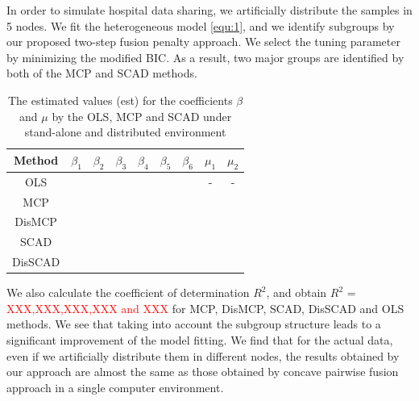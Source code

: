 \documentclass[review]{elsarticle}
\begin{document}
In order to simulate hospital data sharing, we artificially distribute the samples in 5 nodes. We fit the heterogeneous model \ref{equ:1}, and we identify subgroups by our proposed two-step fusion penalty approach. We select the tuning parameter by minimizing the modified BIC. As a result, two major groups are identified by both of the MCP and SCAD methods.
\begin{table}[H]
	\centering
	\fontsize{5.5}{6}\selectfont
	\begin{threeparttable}
		\caption{The estimated values (est) for the coefficients $\beta$ and $\mu$ by the OLS, MCP and SCAD under stand-alone and distributed environment}
		\label{tab:3}
		\begin{tabular}{ccccccccc}
			\toprule
			Method&$\beta_1$&$\beta_2$&$\beta_3$&$\beta_4$&$\beta_5$&$\beta_6$&$\mu_1$&$\mu_2$\\
			\midrule
			OLS&&&&&&&-&-\\
			MCP&&&&&&&&\\
			DisMCP&&&&&&&&\\
			SCAD&&&&&&&&\\
			DisSCAD&&&&&&&&\\
			\bottomrule
		\end{tabular}
	\end{threeparttable}
\end{table}
We also calculate the coefficient of determination $R^2$, and obtain $R^2$ = \textcolor{red}{XXX,XXX,XXX,XXX and XXX} for MCP, DisMCP, SCAD, DisSCAD and OLS methods. We see that taking into account the subgroup structure leads to a significant improvement of the model fitting. We find that for the actual data, even if we artificially distribute them in different nodes, the results obtained by our approach are almost the same as those obtained by concave pairwise fusion approach in a single computer environment.
\end{document}
